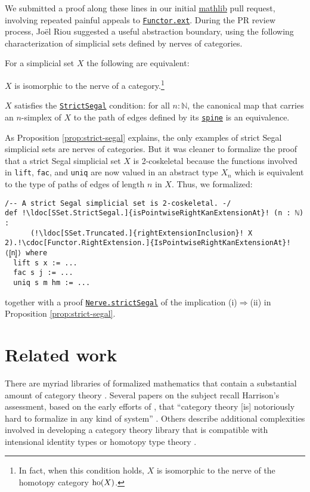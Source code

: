 \documentclass[a4paper,UKenglish,cleveref, autoref, thm-restate]{lipics-v2021}
\newcommand{\ho}{\textup{ho}}
\newcommand{\NN}{\mathbb{N}}
\newcommand{\1}{\mathbbe{1}}
\newcommand{\2}{\mathbbe{2}}
\newcommand{\3}{\mathbbe{3}}
\newcommand{\libmathlib}{\href{https://github.com/leanprover-community/mathlib}{\textsf{mathlib}}}
\newcommand{\ldoc}[2][]{\href{https://leanprover-community.github.io/mathlib4_docs/find/?pattern=#1#2\#doc}{\texttt{#2}}}
\newcommand{\cdoc}[2][]{\href{https://leanprover-community.github.io/mathlib4_docs/find/?pattern=CategoryTheory.#1#2\#doc}{\texttt{#2}}}
\begin{document}
We submitted a proof along these lines in our initial \libmathlib{} pull request, involving repeated painful appeals to \cdoc{Functor.ext}. During the PR review process, Jo\"{e}l Riou suggested a useful abstraction boundary, using the following characterization of simplicial sets defined by nerves of categories.

\begin{proposition}[\cdoc{Nerve.strictSegal}]\label{prop:strict-segal}
  For a simplicial set $X$ the following are equivalent:
  \begin{romanenumerate}
    \item $X$ is isomorphic to the nerve of a category.\footnote{In fact, when this condition holds, $X$ is isomorphic to the nerve of the homotopy category $\ho(X)$.}
    \item $X$ satisfies the \ldoc[SSet.]{StrictSegal} condition: for all $n : \NN$, the canonical map that carries an $n$-simplex of $X$ to the path of edges defined by its \ldoc[SSet.]{spine} is an equivalence.
  \end{romanenumerate}
\end{proposition}

As Proposition \ref{prop:strict-segal} explains, the only examples of strict Segal simplicial sets are nerves of categories. But it was cleaner to formalize the proof that a strict Segal simplicial set $X$ is 2-coskeletal because the functions involved in \lstinline|lift|, \lstinline|fac|, and \lstinline|uniq| are now valued in an abstract type $X_n$ which is equivalent to the type of paths of edges of length $n$ in $X$. Thus, we formalized:
\begin{lstlisting}
/-- A strict Segal simplicial set is 2-coskeletal. -/
def !\ldoc[SSet.StrictSegal.]{isPointwiseRightKanExtensionAt}! (n : ℕ) :
      (!\ldoc[SSet.Truncated.]{rightExtensionInclusion}! X 2).!\cdoc[Functor.RightExtension.]{IsPointwiseRightKanExtensionAt}! ⟨⦋n⦌⟩ where
  lift s x := ...
  fac s j := ...
  uniq s m hm := ...
\end{lstlisting}
together with a proof \cdoc{Nerve.strictSegal} of the implication (i)$\Rightarrow$(ii) in Proposition \ref{prop:strict-segal}.


\section{Related work}\label{sec:related-work}

There are myriad libraries of formalized mathematics that contain a substantial amount of category theory \cite{ BauerGrossLumsdaineShulmanSozeauSpitters2017, hott-in:agda, HuCarette2021, 1Lab, mathlib2020, CZH_Foundations-AFP,CZH_Elementary_Categories-AFP,CZH_Universal_Constructions-AFP, agda-unimath, VezzosiMoertbergAbel2021, UniMath}. Several papers on the subject \cite{GrossChlipalaSpivak, OKeefe2005} recall Harrison's assessment, based on the early efforts of \cite{HS-Constructive}, that ``category theory [is] notoriously hard to formalize in any kind of system'' \cite{harrison1996formalized}. Others describe additional complexities involved in developing a category theory library that is compatible with intensional identity types or homotopy type theory \cite{AKS-Univalent, HuCarette2021}.
\end{document}
